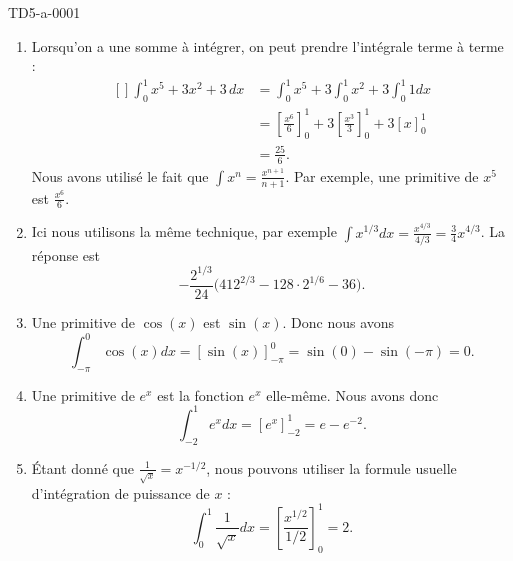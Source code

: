 
\begin{corrige}{TD5-a-0001}

	\begin{enumerate}
		\item
			Lorsqu'on a une somme à intégrer, on peut prendre l'intégrale terme à terme :
			\begin{equation}
				\begin{aligned}[]
					\int_{0}^1x^5+3x^2+3\,dx&=\int_0^1x^5+3\int_0^1x^2+3\int_0^1 1dx\\
					&=\left[ \frac{ x^6 }{ 6 } \right]_0^1+3\left[ \frac{ x^3 }{ 3 } \right]_0^1+3\left[ x \right]_0^1\\
					&=\frac{ 25 }{ 6 }.
				\end{aligned}
			\end{equation}
			Nous avons utilisé le fait que $\int x^n=\frac{ x^{n+1} }{ n+1 }$. Par exemple, une primitive de $x^5$ est $\frac{ x^6 }{ 6 }$.
		\item
			Ici nous utilisons la même technique, par exemple $\int x^{1/3}dx=\frac{ x^{4/3} }{ 4/3 }=\frac{ 3 }{ 4 }x^{4/3}$. La réponse est
			\begin{equation}
				-\frac{2^{1/3}}{ 24 }\big( 412^{2/3}-128\cdot 2^{1/6}-36 \big).
			\end{equation}
		\item
			Une primitive de $\cos(x)$ est $\sin(x)$. Donc nous avons
			\begin{equation}
				\int_{-\pi}^0\cos(x)dx=\left[ \sin(x) \right]_{-\pi}^0=\sin(0)-\sin(-\pi)=0.
			\end{equation}
		\item
			Une primitive de $e^x$ est la fonction $e^x$ elle-même. Nous avons donc
			\begin{equation}
				\int_{-2}^1 e^{x}dx=\left[ e^x \right]_{-2}^1=e-e^{-2}.
			\end{equation}
		\item
			Étant donné que $\frac{1}{ \sqrt{x} }=x^{-1/2}$, nous pouvons utiliser la formule usuelle d'intégration de puissance de $x$ :
			\begin{equation}
				\int_0^1\frac{1}{ \sqrt{x} }dx=\left[ \frac{ x^{1/2} }{ 1/2 } \right]_0^1=2.
			\end{equation}
			
	\end{enumerate}

\end{corrige}
